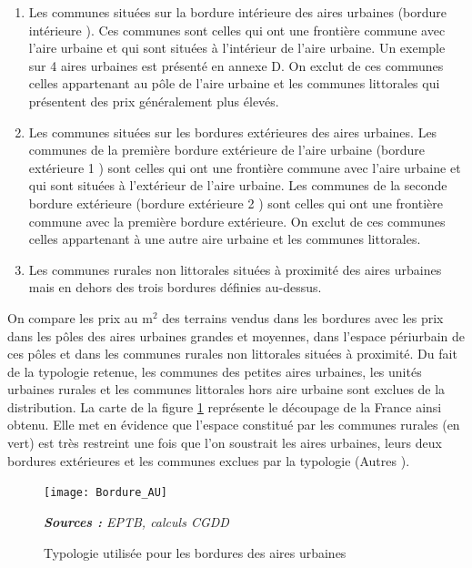\documentclass[10.5pt,a4paper]{article}
\begin{document}
{\begin{enumerate}
		\item Les communes situées sur la bordure intérieure des aires urbaines (\og bordure intérieure \fg). Ces communes sont celles qui ont une frontière commune avec l'aire urbaine et qui sont situées à l'intérieur de l'aire urbaine. Un exemple sur 4 aires urbaines est présenté en annexe D. On exclut de ces communes celles appartenant au pôle de l'aire urbaine et les communes littorales qui présentent des prix généralement plus élevés.
	\item Les communes situées sur les bordures extérieures des aires urbaines. Les communes de la première bordure extérieure de l'aire urbaine (\og bordure extérieure 1 \fg)  sont celles qui ont une frontière commune avec l'aire urbaine et qui sont situées à l'extérieur de l'aire urbaine. Les communes de la seconde bordure extérieure (\og bordure extérieure 2 \fg)  sont celles qui ont une frontière  commune avec la première bordure extérieure. On exclut de ces communes celles appartenant à une autre aire urbaine et les communes littorales. 	
		\item Les communes rurales non littorales situées à proximité des aires urbaines mais en dehors des trois bordures définies au-dessus. 
\end{enumerate}

On compare les prix au m$^2$ des terrains vendus dans les bordures avec les prix dans les pôles des aires urbaines grandes et moyennes, dans l'espace périurbain de ces pôles et dans les communes rurales non littorales situées à proximité. Du fait de la typologie retenue, les communes des petites aires urbaines, les unités urbaines rurales et les communes littorales hors aire urbaine sont exclues de la distribution. La carte de la figure \ref{Bordure_AU} représente le découpage de la France ainsi obtenu. Elle met en évidence que l'espace constitué par les communes rurales (en vert) est très restreint une fois que l'on soustrait les aires urbaines, leurs deux bordures extérieures et les communes exclues par la typologie (\og Autres \fg).  \par

\begin{figure}[!h]%
\begin{center}
\caption{Typologie utilisée pour les bordures des aires urbaines}%
\label{Bordure_AU}%
\texttt{[image: Bordure\_AU]}%
\end{center} 
\scriptsize \textit{\textbf{Sources :} EPTB, calculs CGDD}
\end{figure}

}
\end{document}
